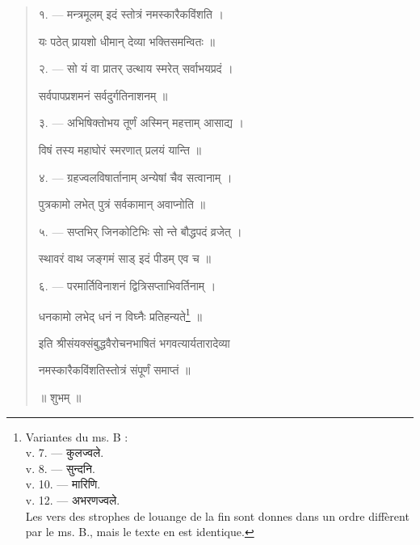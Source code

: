 \documentclass[a4paper, 11pt, oneside, french]{article}
\begin{document}
\begin{quotation}
\bigskip

\texthindi{१}. --- \texthindi{मन्त्रमूलम् इदं स्तोत्रं नमस्कारैकविंशति ।}

\texthindi{यः पठेत् प्रायशो धीमान् देव्या भक्तिसमन्वितः ॥}

\bigskip

\texthindi{२}. --- \texthindi{सो यं वा प्रातर् उत्थाय स्मरेत् सर्वाभयप्रदं ।}

\texthindi{सर्वपापप्रशमनं सर्वदुर्गतिनाशनम् ॥}

\bigskip

\texthindi{३}. --- \texthindi{अभिषिक्तोभय तूर्णं अस्मिन् महत्ताम् आसाद्य ।}

\texthindi{विषं तस्य महाघोरं स्मरणात् प्रलयं यान्ति ॥}

\bigskip

\texthindi{४}. --- \texthindi{ग्रहज्वलविषार्तानाम् अन्येषां चैव सत्वानाम् ।}

\texthindi{पुत्रकामो लभेत् पुत्रं सर्वकामान् अवाप्नोति ॥}

\bigskip

\texthindi{५}. --- \texthindi{सप्तभिर् जिनकोटिभिः सो न्ते बौद्धपदं व्रजेत् ।}

\texthindi{स्थावरं वाथ जङ्गमं साड् इदं पीडम् एव च ॥}

\bigskip

\texthindi{६}. --- \texthindi{परमार्तिविनाशनं द्वित्रिसप्ताभिवर्तिनाम् ।}

\texthindi{धनकामो लभेद् धनं न विघ्नैः प्रतिहन्यते}\footnote{Variantes du ms. B :\\\hspace*{10mm}v. 7. --- \texthindi{कुलज्वले}.\\\hspace*{10mm}v. 8. --- \texthindi{सुन्दनि}.\\\hspace*{10mm}v. 10. --- \texthindi{मारिणि}.\\\hspace*{10mm}v. 12. --- \texthindi{अभरणज्वले}.\\\hspace*{5mm}Les vers des strophes de louange de la fin sont donnes dans un ordre diffèrent par le ms. B., mais le texte en est identique.} \texthindi{॥}

\bigskip

\texthindi{इति श्रीसंयक्संबुद्धवैरोचनभाषितं भगवत्यार्यतारादेव्या}

\texthindi{नमस्कारैकविंशतिस्तोत्रं संपूर्णं समाप्तं ॥}

\bigskip

\texthindi{॥ शुभम् ॥}
\end{quotation}
\clearpage
\end{document}
